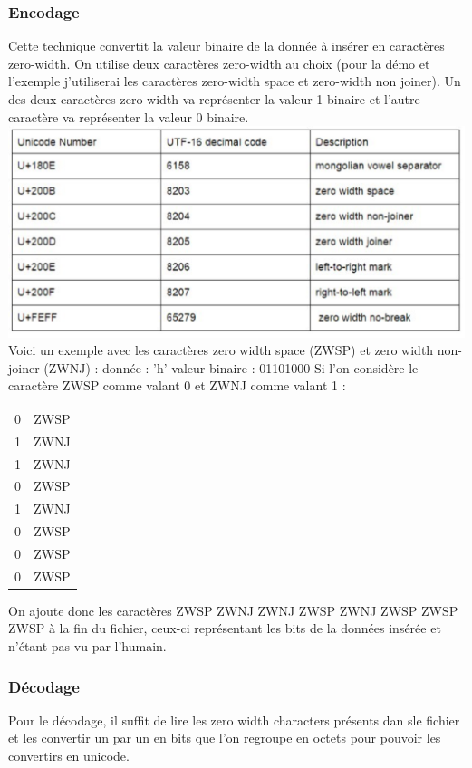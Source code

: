 \subsubsection{Encodage}
Cette technique convertit la valeur binaire de la donnée à insérer en caractères zero-width. On utilise deux caractères zero-width au choix (pour la démo et l'exemple j'utiliserai les caractères zero-width space et zero-width non joiner). Un des deux caractères zero width va représenter la valeur 1 binaire et l'autre caractère va représenter la valeur 0 binaire.
\newline
\includegraphics[width=1\textwidth]{img/zw-characters.eps}
\newline
Voici un exemple avec les caractères zero width space (ZWSP) et zero width non-joiner (ZWNJ) :
\newline
donnée : 'h'
\newline
valeur binaire : 01101000
\newline
Si l'on considère le caractère ZWSP comme valant 0 et ZWNJ comme valant 1 :
\begin{center}
\begin{tabular}{c c}
	0 & ZWSP \\
	1 & ZWNJ \\
	1 & ZWNJ \\
	0 & ZWSP \\
	1 & ZWNJ \\
	0 & ZWSP \\
	0 & ZWSP \\
	0 & ZWSP
\end{tabular}
\end{center}
On ajoute donc les caractères ZWSP ZWNJ ZWNJ ZWSP ZWNJ ZWSP ZWSP ZWSP à la fin du fichier, ceux-ci représentant les bits de la données insérée et n'étant pas vu par l'humain.
\subsubsection{Décodage}
Pour le décodage, il suffit de lire les zero width characters présents dan sle fichier et les convertir un par un en bits que l'on regroupe en octets pour pouvoir les convertirs en unicode.
